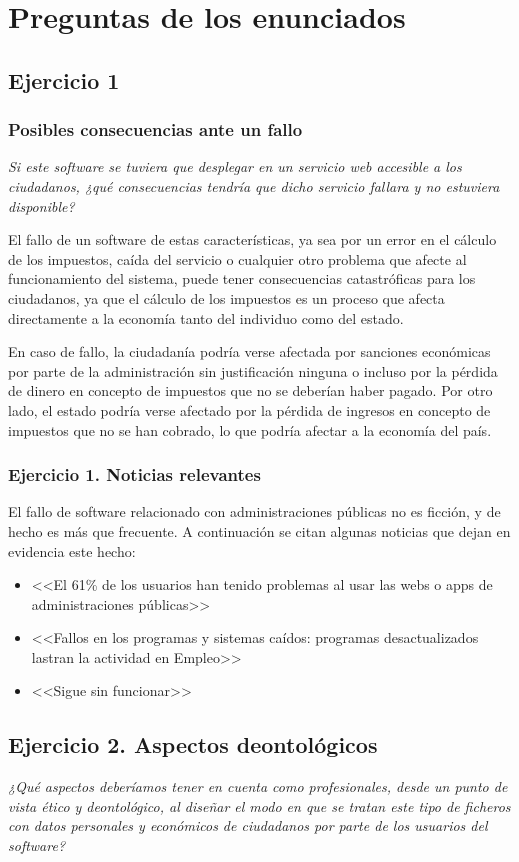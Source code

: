 \chapter{Preguntas de los enunciados}
\section{Ejercicio 1}
\subsection{Posibles consecuencias ante un fallo}
\textit{Si este software se tuviera que desplegar en un servicio web accesible a los ciudadanos,
¿qué consecuencias tendría que dicho servicio fallara y no estuviera disponible?}

El fallo de un software de estas características, ya sea por un error en el cálculo de los impuestos, caída
del servicio o cualquier otro problema que afecte al funcionamiento del sistema, puede tener consecuencias
catastróficas para los ciudadanos, ya que el cálculo de los impuestos es un proceso que afecta directamente
a la economía tanto del individuo como del estado.

En caso de fallo, la ciudadanía podría verse afectada por sanciones económicas por parte de la administración
sin justificación ninguna o incluso por la pérdida de dinero en concepto de impuestos que no se deberían haber
pagado. Por otro lado, el estado podría verse afectado por la pérdida de ingresos en concepto de impuestos que
no se han cobrado, lo que podría afectar a la economía del país.

\subsection{Ejercicio 1. Noticias relevantes}
El fallo de software relacionado con administraciones públicas no es ficción, y de hecho es
más que frecuente. A continuación se citan algunas noticias que dejan en evidencia este hecho:
\begin{itemize}
	\item <<El 61\% de los usuarios han tenido problemas al usar las webs o apps de administraciones públicas>>\cite{newtral}
	\item <<Fallos en los programas y sistemas caídos: programas desactualizados lastran la actividad en Empleo>>\cite{abc}
	\item <<Sigue sin funcionar>>\cite{elpais}
\end{itemize}
\newpage
\section{Ejercicio 2. Aspectos deontológicos}
\textit{¿Qué aspectos deberíamos tener en cuenta como profesionales, desde un punto de vista ético
y deontológico, al diseñar el modo en que se tratan este tipo de ficheros con datos personales y
económicos de ciudadanos por parte de los usuarios del software?}


